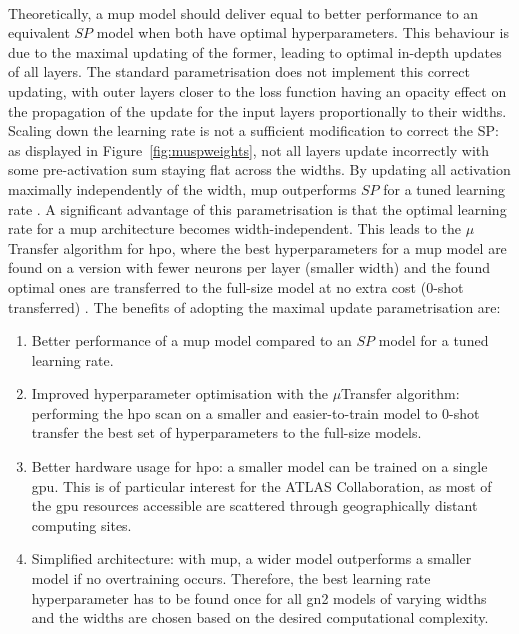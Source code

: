 \paragraph{}Theoretically, a \gls{mup} model should deliver equal to better performance to an equivalent $SP$ model when both have optimal hyperparameters. This behaviour is due to the maximal updating of the former, leading to optimal in-depth updates of all layers. The standard parametrisation does not implement this correct updating, with outer layers closer to the loss function having an opacity effect on the propagation of the update for the input layers proportionally to their widths. Scaling down the learning rate is not a sufficient modification to correct the SP: as displayed in Figure~\ref{fig:muspweights}, not all layers update incorrectly with some pre-activation sum staying flat across the widths. By updating all activation maximally independently of the width, \gls{mup} outperforms $SP$ for a tuned learning rate \cite{pmlr-v139-yang21c}. A significant advantage of this parametrisation is that the optimal learning rate for a \gls{mup} architecture becomes width-independent. This leads to the $\mu$Transfer algorithm for \gls{hpo}, where the best hyperparameters for a \gls{mup} model are found on a version with fewer neurons per layer (smaller width) and the found optimal ones are transferred to the full-size model at no extra cost (0-shot transferred) \cite{yang2021tuning}. The benefits of adopting the maximal update parametrisation are:
\begin{enumerate}
  \item Better performance of a \gls{mup} model compared to an $SP$ model for a tuned learning rate.
  \item Improved hyperparameter optimisation with the $\mu$Transfer algorithm: performing the \gls{hpo} scan on a smaller and easier-to-train model to 0-shot transfer the best set of hyperparameters to the full-size models. 
  \item Better hardware usage for \gls{hpo}: a smaller model can be trained on a single \gls{gpu}. This is of particular interest for the ATLAS Collaboration, as most of the \gls{gpu} resources accessible are scattered through geographically distant computing sites.  
  \item Simplified architecture: with \gls{mup}, a wider model outperforms a smaller model if no overtraining occurs. Therefore, the best learning rate hyperparameter has to be found once for all \gls{gn2} models of varying widths and the widths are chosen based on the desired computational complexity.
\end{enumerate}

